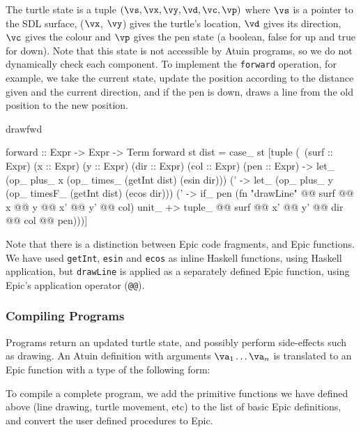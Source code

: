 \noindent
The turtle state is a tuple
$(\vs,\vx,\vy,\vd,\vc,\vp)$ where $\vs$ is a pointer to the SDL
surface, ($\vx$, $\vy$) gives the turtle's location, $\vd$ gives its
direction, $\vc$ gives the colour and $\vp$ gives the pen
state (a boolean, false for up and true for down). Note that this
state is not accessible by Atuin programs, so we do not dynamically check
each component.
To implement the \texttt{forward} operation, for example, we take the
current state, update the position according to the distance
given and the current direction, and if the pen is down, draws a line
from the old position to the new position.

\begin{SaveVerbatim}{drawfwd}

forward :: Expr -> Expr -> Term
forward st dist = case_ st 
  [tuple (\ (surf :: Expr) (x :: Expr) (y :: Expr) 
            (dir :: Expr) (col :: Expr) (pen :: Expr) -> 
    let_ (op_ plus_ x (op_ times_ (getInt dist) (esin dir)))
      (\x' -> let_ (op_ plus_ y (op_ timesF_ (getInt dist) (ecos dir)))
      (\y' -> if_ pen (fn "drawLine" @@ surf @@ x @@ y 
                                     @@ x' @@ y' @@ col) unit_ +>
              tuple_ @@ surf @@ x' @@ y' @@ dir @@ col @@ pen)))]

\end{SaveVerbatim}

\noindent
Note that there is a distinction between Epic code fragments, and Epic
functions. We have used \texttt{getInt}, \texttt{esin} and
\texttt{ecos} as inline Haskell functions, using Haskell application,
but \texttt{drawLine} is applied as a separately defined Epic
function, using Epic's application operator (\texttt{@@}).

\subsubsection{Compiling Programs}

Programs return an updated turtle state, and possibly perform 
side-effects such as drawing. An Atuin definition with
arguments $\va_1\ldots\va_n$ is translated to an Epic function
with a type of the following form:


\noindent
To compile a complete program, we add the primitive functions we have
defined above (line drawing, turtle movement, etc) to the list of
basic Epic definitions, and convert the user defined procedures to Epic.

